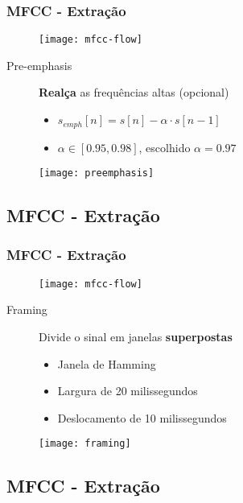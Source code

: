 \begin{frame}
\frametitle{MFCC - Extração}
\begin{figure}[ht]
    \centering
    \texttt{[image: mfcc-flow]}
\end{figure}

\begin{description}
    \item[Pre-emphasis] \textbf{Realça} as frequências altas (opcional)
    \begin{itemize}
        \item $s_{emph}[n] = s[n] - \alpha \cdot s[n - 1]$
        \item $\alpha \in [0.95, 0.98]$, escolhido $\alpha = 0.97$
    \end{itemize}
\end{description}
\begin{figure}[ht]
    \centering
    \texttt{[image: preemphasis]}
\end{figure}
\end{frame}

\subsection{MFCC - Extração}

\begin{frame}
\frametitle{MFCC - Extração}
\begin{figure}[ht]
    \centering
    \texttt{[image: mfcc-flow]}
\end{figure}

\begin{description}
    \item[Framing] Divide o sinal em janelas \textbf{superpostas}
    \begin{itemize}
        \item Janela de Hamming
        \item Largura de 20 milissegundos
        \item Deslocamento de 10 milissegundos
    \end{itemize}
\end{description}
\begin{figure}[ht]
    \centering
    \texttt{[image: framing]}
\end{figure}
\end{frame}

\subsection{MFCC - Extração}

